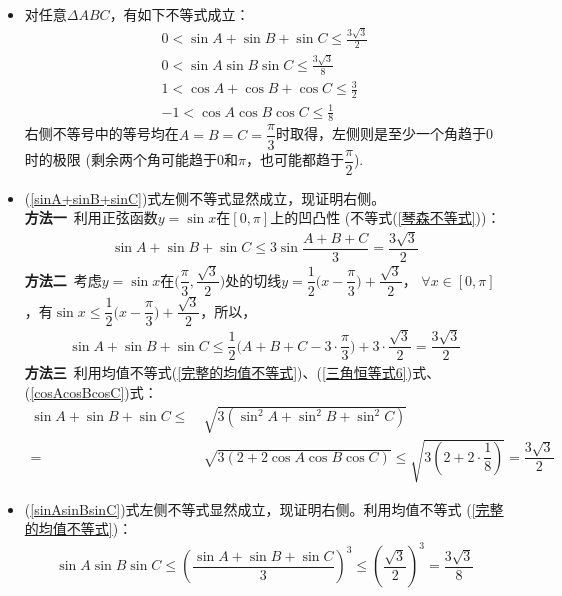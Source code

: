 \begin{itemize}[leftmargin=\inteval{\myitemleftmargin}pt,itemsep=
    \inteval{\myitemitempsep}pt,topsep=\inteval{\myitemtopsep}pt]
\item 对任意$ \Delta ABC $，有如下不等式成立：
\begin{gather}
    0<\sin A +\sin B +\sin C \leq \frac{3\sqrt{3}}{2} \label{sinA+sinB+sinC}\\    
    0<\sin A \sin B \sin C \leq \frac{3\sqrt{3}}{8} \label{sinAsinBsinC}\\
    1<\cos A +\cos B +\cos C \leq \frac{3}{2} \label{cosA+cosB+cosC}\\
    -1<\cos A\cos B\cos C \leq \frac{1}{8} \label{cosAcosBcosC}
\end{gather}
右侧不等号中的等号均在$ A=B=C=\dfrac{\pi}{3} $时取得，左侧则是至少一个角趋于0时的极限
(剩余两个角可能趋于$ 0 $和$ \pi $，也可能都趋于$ \dfrac{\pi}{2} $).

\item (\ref{sinA+sinB+sinC})式左侧不等式显然成立，现证明右侧。\\
\textbf{方法一}\ 利用正弦函数$ y=\sin x $在$ [0,\pi] $上的凹凸性
(不等式(\ref{琴森不等式}))：
\begin{gather*}
    \sin A +\sin B +\sin C \leq 3\sin \dfrac{A+B+C}{3}=\dfrac{3\sqrt{3}}{2}
\end{gather*}
\textbf{方法二}\ 考虑$ y=\sin x $在$ \Big(\dfrac{\pi}{3},\dfrac{\sqrt{3}}{2}
\Big) $处的切线$ y=\dfrac{1}{2}\Big(x-\dfrac{\pi}{3}\Big)+\dfrac{\sqrt{3}}{2} $，
$ \forall x\in [0,\pi] $，有$ \sin x\leq \dfrac{1}{2}\Big(x-\dfrac{\pi}{3}\Big)
+\dfrac{\sqrt{3}}{2} $，所以，
\begin{gather*}
    \sin A +\sin B +\sin C \leq \dfrac{1}{2}\Big(A+B+C-3\cdot\dfrac{\pi}{3}\Big)
    +3\cdot\dfrac{\sqrt{3}}{2}=\dfrac{3\sqrt{3}}{2}
\end{gather*}
\textbf{方法三}\ 利用均值不等式(\ref{完整的均值不等式})、(\ref{三角恒等式6})式、
(\ref{cosAcosBcosC})式：
\begin{align*}
    \sin A +\sin B +\sin C \leq &\ \sqrt{3(\sin^2A+\sin^2B+\sin^2C)} \\
    =&\ \sqrt{3(2+2\cos A\cos B\cos C)}\leq \sqrt{3\left(2+2\cdot 
        \dfrac{1}{8}\right)}=\dfrac{3\sqrt{3}}{2}
\end{align*}

\item (\ref{sinAsinBsinC})式左侧不等式显然成立，现证明右侧。利用均值不等式
(\ref{完整的均值不等式})：
\begin{gather}
    \sin A \sin B \sin C \leq \left(\dfrac{\sin A +\sin B +\sin C}{3} \right)^3
    \leq \left(\dfrac{\sqrt{3}}{2}\right)^3=\dfrac{3\sqrt{3}}{8}
    \label{三个正弦和不等式-小于}
\end{gather}


\end{itemize}
